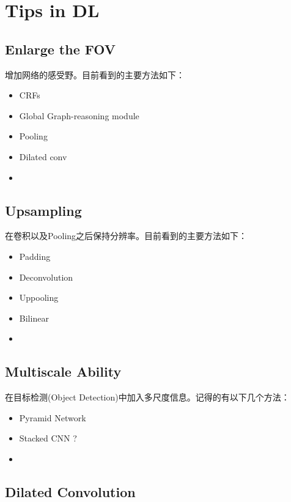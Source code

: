 \chapter{Tips in DL}

\section{Enlarge the FOV}

增加网络的感受野。目前看到的主要方法如下：

\begin{itemize}
\item CRFs\cite{marvin2018crf}
\item Global Graph-reasoning module\cite{chen18iterative}
\item Pooling
\item Dilated conv\cite{YuKoltun2016}
\item 
\end{itemize}


\section{Upsampling}

在卷积以及Pooling之后保持分辨率。目前看到的主要方法如下：

\begin{itemize}
\item Padding
\item Deconvolution
\item Uppooling
\item Bilinear
\item 
\end{itemize}


\section{Multiscale Ability}

在目标检测(Object Detection)中加入多尺度信息。记得的有以下几个方法：

\begin{itemize}
\item Pyramid Network
\item Stacked CNN ?
\item 
\end{itemize}


\section{Dilated Convolution}

